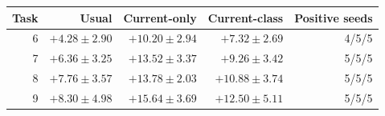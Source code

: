 \begin{tabular}{rrrrr}
\toprule
Task & Usual & Current-only & Current-class & Positive seeds\\
\midrule
6 & $+4.28\pm2.90$ & $+10.20\pm2.94$ & $+7.32\pm2.69$ & 4/5/5\\
7 & $+6.36\pm3.25$ & $+13.52\pm3.37$ & $+9.26\pm3.42$ & 5/5/5\\
8 & $+7.76\pm3.57$ & $+13.78\pm2.03$ & $+10.88\pm3.74$ & 5/5/5\\
9 & $+8.30\pm4.98$ & $+15.64\pm3.69$ & $+12.50\pm5.11$ & 5/5/5\\
\bottomrule
\end{tabular}
